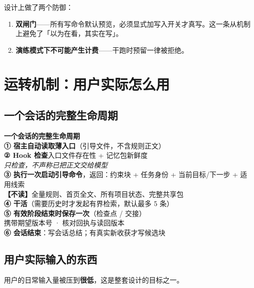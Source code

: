 \documentclass[11pt,a4paper]{ctexart}
\newcommand{\keybox}[1]{%
  \begin{center}%
  \begin{minipage}{0.94\linewidth}%
  \setlength{\fboxsep}{9pt}%
  \colorbox{SoftGray}{\parbox{\dimexpr\linewidth-2\fboxsep}{#1}}%
  \end{minipage}%
  \end{center}%
}
\begin{document}
设计上做了两个防御：

\begin{enumerate}
  \item \textbf{双闸门}——所有写命令默认预览，必须显式加写入开关才真写。这一条从机制上避免了「以为在看，其实在写」。
  \item \textbf{演练模式下不可能产生计费}——干跑时预留一律被拒绝。
\end{enumerate}

\section{运转机制：用户实际怎么用}

\subsection{一个会话的完整生命周期}

\keybox{\small
\textbf{一个会话的完整生命周期}\\[0.7em]
\textbf{① 宿主自动读取薄入口}（引导文件，不含规则正文）\\[0.3em]
\textbf{② Hook 检查}入口文件存在性 + 记忆包新鲜度\\
\hspace{1.6em}\emph{只检查，不声称已把正文交给模型}\\[0.3em]
\textbf{③ 执行一次启动引导命令}，返回：约束块 + 任务身份 + 当前目标/下一步 + 适用线索\\
\hspace{1.6em}\textcolor{WarnRed}{\textbf{【不读】}全量规则、首页全文、所有项目状态、完整共享包}\\[0.3em]
\textbf{④ 干活}（需要历史时才发起有界检索，默认最多 5 条）\\[0.3em]
\textbf{⑤ 有效阶段结束时保存一次}（检查点 / 交接）\\
\hspace{1.6em}携带期望版本号 · 核对回执与读回版本\\[0.3em]
\textbf{⑥ 会话结束}：写会话总结；有真实新收获才写候选块}

\subsection{用户实际输入的东西}

用户的日常输入量被压到\textbf{很低}，这是整套设计的目标之一。
\end{document}
